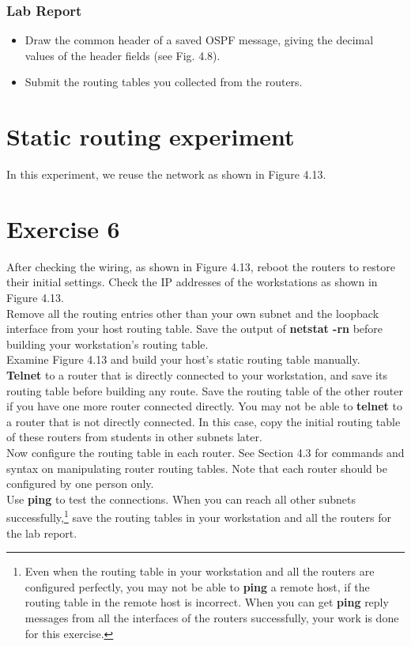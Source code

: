\documentclass[10pt,a4paper]{article}
\numberwithin{equation}{section}
\numberwithin{figure}{section}
\numberwithin{table}{section}
\begin{document}
    \subsubsection*{Lab Report}
    \begin{itemize}
        \setlength{\itemindent}{0pt}
        \item Draw the common header of a saved OSPF message, giving the decimal values of the header fields (see Fig. 4.8).
        \item Submit the routing tables you collected from the routers.
    \end{itemize}

    \section*{Static routing experiment}
    In this experiment, we reuse the network as shown in Figure 4.13.

    \section{Exercise 6}
    After checking the wiring, as shown in Figure 4.13, reboot the routers to restore their initial settings.
    Check the IP addresses of the workstations as shown in Figure 4.13. \\
    Remove all the routing entries other than your own subnet and the loopback interface from your host routing table.
    Save the output of \textbf{netstat -rn} before building your workstation’s routing table. \\
    Examine Figure 4.13 and build your host’s static routing table manually. \\
    \textbf{Telnet} to a router that is directly connected to your workstation, and save its routing table before building any route.
    Save the routing table of the other router if you have one more router connected directly.
    You may not be able to \textbf{telnet} to a router that is not directly connected.
    In this case, copy the initial routing table of these routers from students in other subnets later. \\
    Now configure the routing table in each router.
    See Section 4.3 for commands and syntax on manipulating router routing tables.
    Note that each router should be configured by one person only. \\
    Use \textbf{ping} to test the connections.
    When you can reach all other subnets successfully,\footnote{Even when the routing table in your workstation and all the routers are configured perfectly, you may not be able to \textbf{ping} a remote host, if the routing table in the remote host is incorrect.
    When you can get \textbf{ping} reply messages from all the interfaces of the routers successfully, your work is done for this exercise.} save the routing tables in your workstation and all the routers for the lab report.
\end{document}
